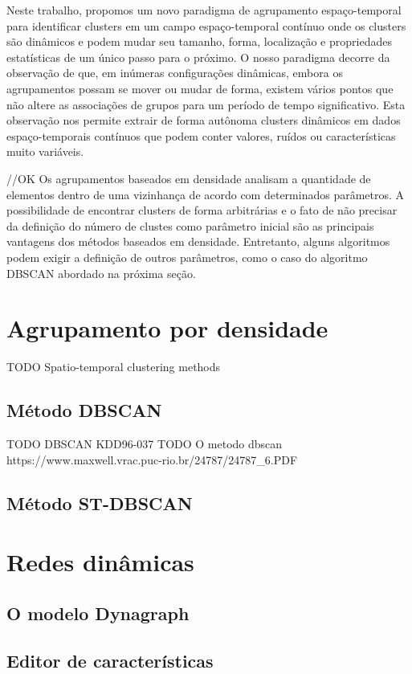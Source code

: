 Neste trabalho, propomos um novo paradigma de agrupamento espaço-temporal para identificar clusters em um campo espaço-temporal contínuo onde os clusters são dinâmicos e podem mudar seu tamanho, forma, localização e propriedades estatísticas de um único passo para o próximo. O nosso paradigma decorre da observação de que, em inúmeras configurações dinâmicas, embora os agrupamentos possam se mover ou mudar de forma, existem vários pontos que não altere as associações de grupos para um período de tempo significativo.
Esta observação nos permite extrair de forma autônoma clusters dinâmicos em dados espaço-temporais contínuos que podem conter valores, ruídos ou características muito variáveis.

//OK
Os agrupamentos baseados em densidade analisam a quantidade de elementos dentro
de uma vizinhança de acordo com determinados parâmetros. 
 A possibilidade de encontrar clusters de forma arbitrárias e o fato de não precisar da definição do número de clustes \cite{yip2005} como parâmetro inicial são as principais vantagens dos métodos baseados em densidade. Entretanto, alguns algoritmos podem exigir a definição de outros parâmetros, como o caso do algoritmo DBSCAN \cite{density-based-clusters} abordado na próxima seção.

\section{Agrupamento por densidade}
TODO Spatio-temporal clustering methods

\subsection{Método DBSCAN}
TODO DBSCAN KDD96-037
TODO O metodo dbscan https://www.maxwell.vrac.puc-rio.br/24787/24787_6.PDF
\subsection{Método ST-DBSCAN}
\section{Redes dinâmicas}
\subsection{O modelo Dynagraph}
\subsection{Editor de características}
